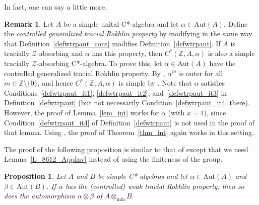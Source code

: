 \documentclass[11pt]{amsart}
\theoremstyle{plain}
\newtheorem{proposition}[theorem]{Proposition}
\theoremstyle{definition}
\newtheorem{remark}[theorem]{Remark}
\theoremstyle{remark}
\numberwithin{equation}{section}
\begin{document}
In fact, one can say a little more.

\begin{remark}\label{cor_int_u}
Let $A$ be a simple unital
C*-algebra and let $\alpha \in \mathrm{Aut} (A)$.
Define the
{\emph{controlled generalized tracial Rokhlin property}}
by modifying \cite[Definition 6.1]{HO13}
in the same way that Definition~\ref{defwtrpaut_cont}
modifies Definition~\ref{defwtrpaut}.
If $A$ is tracially $\mathcal{Z}$-absorbing
and $\alpha$ has this property,
then  $C^{*} (\mathbb{Z}, A, \alpha)$
is also a simple tracially $\mathcal{Z}$-absorbing
C*-algebra.
To prove this,
let $\alpha \in \mathrm{Aut} (A)$
have the controlled generalized tracial Rokhlin property.
By \cite[Proposition~6.3]{HO13},
$\alpha^{m}$ is outer for all $m \in \mathbb{Z} \setminus \{ 0 \}$,
and hence $C^{*} (\mathbb{Z}, A, \alpha)$ is simple
by \cite[Theorem 3.1]{Ki81}.
Note that $\alpha$ satisfies
Conditions~\eqref{defwtrpaut_it1}, \eqref{defwtrpaut_it2},
and~\eqref{defwtrpaut_it3} in
Definition~\ref{defwtrpaut}
(but not necessarily Condition~\eqref{defwtrpaut_it4} there).
However, the proof of Lemma~\ref{lem_int} works for
$\alpha$ (with $x = 1$),
since Condition~\eqref{defwtrpaut_it4} of Definition~\ref{defwtrpaut}
is not used in the proof of that lemma.
Using  \cite[Lemma~3.3]{AGJP21},
the proof of Theorem~\ref{thm_int}
again works in this setting.
\end{remark}

The proof of the following proposition is  
similar to that of \cite[Theorem~4.5]{FG17}
except that we need Lemma~\ref{L_8612_AppInv}
instead of using the finiteness of the group.

\begin{proposition}\label{Prop_tensor}
Let $A$ and $B$ be simple C*-algebras and let
$\alpha\in\mathrm{Aut}(A)$ and $\beta\in\mathrm{Aut}(B)$.
If  $\alpha$  has the (controlled) weak tracial Rokhlin property, then
so does the automorphism $\alpha\otimes \beta$ of
$A\otimes_{\min} B$.
\end{proposition}
\end{document}
